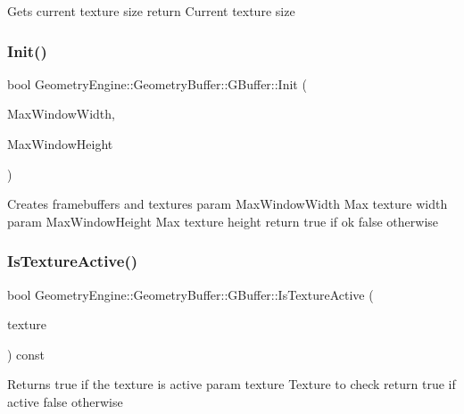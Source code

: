 Gets current texture size return Current texture size \mbox{\label{class_geometry_engine_1_1_geometry_buffer_1_1_g_buffer_ad4d5684575aa5819a91097a1b6a0e8df}} 
\subsubsection{\texorpdfstring{Init()}{Init()}}
{\footnotesize\ttfamily bool Geometry\+Engine\+::\+Geometry\+Buffer\+::\+G\+Buffer\+::\+Init (\begin{DoxyParamCaption}\item[{unsigned int}]{Max\+Window\+Width,  }\item[{unsigned int}]{Max\+Window\+Height }\end{DoxyParamCaption})}

Creates framebuffers and textures param Max\+Window\+Width Max texture width param Max\+Window\+Height Max texture height return true if ok false otherwise \mbox{\label{class_geometry_engine_1_1_geometry_buffer_1_1_g_buffer_a66ccde86e455532b2eac771163570f04}} 
\subsubsection{\texorpdfstring{IsTextureActive()}{IsTextureActive()}}
{\footnotesize\ttfamily bool Geometry\+Engine\+::\+Geometry\+Buffer\+::\+G\+Buffer\+::\+Is\+Texture\+Active (\begin{DoxyParamCaption}\item[{\mbox{\hyperlink{class_geometry_engine_1_1_geometry_buffer_1_1_g_buffer_a718dceafcac1915f7de061108597e1cc}{G\+B\+U\+F\+F\+E\+R\+\_\+\+T\+E\+X\+T\+U\+R\+E\+\_\+\+T\+Y\+PE}}}]{texture }\end{DoxyParamCaption}) const\hspace{0.3cm}{\ttfamily [inline]}}

Returns true if the texture is active param texture Texture to check return true if active false otherwise \mbox{\label{class_geometry_engine_1_1_geometry_buffer_1_1_g_buffer_a487fb4fb346b34e5fa4a994e97211bab}} 

